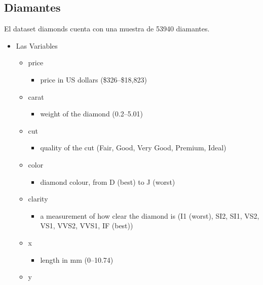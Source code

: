 \documentclass[
]{article}
\providecommand{\tightlist}{%
  \setlength{\itemsep}{0pt}\setlength{\parskip}{0pt}}
\begin{document}
\hypertarget{diamantes}{%
\subsection{Diamantes}\label{diamantes}}

El dataset diamonds cuenta con una muestra de 53940 diamantes.

\begin{itemize}
\item
  Las Variables

  \begin{itemize}
  \tightlist
  \item
    price

    \begin{itemize}
    \tightlist
    \item
      price in US dollars (\$326--\$18,823)
    \end{itemize}
  \item
    carat

    \begin{itemize}
    \tightlist
    \item
      weight of the diamond (0.2--5.01)
    \end{itemize}
  \item
    cut

    \begin{itemize}
    \tightlist
    \item
      quality of the cut (Fair, Good, Very Good, Premium, Ideal)
    \end{itemize}
  \item
    color

    \begin{itemize}
    \tightlist
    \item
      diamond colour, from D (best) to J (worst)
    \end{itemize}
  \item
    clarity

    \begin{itemize}
    \tightlist
    \item
      a measurement of how clear the diamond is (I1 (worst), SI2, SI1,
      VS2, VS1, VVS2, VVS1, IF (best))
    \end{itemize}
  \item
    x

    \begin{itemize}
    \tightlist
    \item
      length in mm (0--10.74)
    \end{itemize}
  \item
    y


\end{itemize}
\end{itemize}
\end{document}
